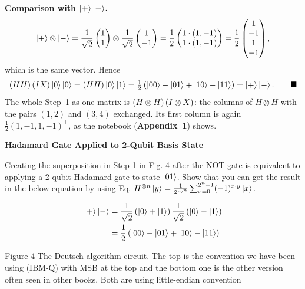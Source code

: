 \documentclass[a4paper, 10pt]{article}
\begin{document}
\begin{solution}
	\noindent \textbf{Comparison with \( \ket{+}\ket{-} \).}
	\[
		\ket{+} \otimes \ket{-}
		= \frac{1}{\sqrt{2}}\begin{pmatrix} 1 \\ 1 \end{pmatrix} \otimes \frac{1}{\sqrt{2}}\begin{pmatrix} 1 \\ -1 \end{pmatrix}
		= \frac{1}{2}\begin{pmatrix} 1 \cdot (1, -1) \\ 1 \cdot (1, -1) \end{pmatrix}
		= \frac{1}{2}\begin{pmatrix} 1 \\ -1 \\ 1 \\ -1 \end{pmatrix},
	\]
	which is the same vector. Hence
	\[
		\left(HH\right)\left(IX\right)\ket{0}\ket{0} = \left(HH\right)\ket{0}\ket{1} = \tfrac{1}{2}\left(\ket{00} - \ket{01} + \ket{10} - \ket{11}\right) = \ket{+}\ket{-}. \qquad \blacksquare
	\]
	The whole Step~1 as one matrix is \( \left(H \otimes H\right)\left(I \otimes X\right) \): the columns of \( H \otimes H \) with the pairs \( (1, 2) \) and \( (3, 4) \) exchanged. Its first column is again \( \tfrac{1}{2}(1, -1, 1, -1)^{\top} \), as the notebook (\textbf{Appendix~1}) shows.
\end{solution}

\begin{problem}
\textbf{Hadamard Gate Applied to 2-Qubit Basis State}
\par Creating the superposition in Step 1 in Fig. 4 after the NOT-gate is equivalent to applying a 2-qubit Hadamard gate to state \( \ket{01} \).
Show that you can get the result in the below equation by using Eq. \( H^{\otimes n} \ket{y} = \frac{1}{2^{n/2}} \sum_{x = 0}^{2^n - 1} (-1)^{x \cdot y} \ket{x} \).

\begin{align*}
	\ket{+}\ket{-} & = \frac{1}{\sqrt{2}} \left(\ket{0} + \ket{1}\right) \frac{1}{\sqrt{2}} \left(\ket{0} - \ket{1}\right) \\
	               & = \frac{1}{2} \left(\ket{00} - \ket{01} + \ket{10} - \ket{11}\right)
\end{align*}


\begin{center}
	{
		\footnotesize Figure 4 The Deutsch algorithm circuit.
		The top is the convention we have been using (IBM-Q) with MSB at the top and the bottom one is the other version often seen in other books.
		Both are using little-endian convention
	}
\end{center}
\end{problem}
\end{document}
